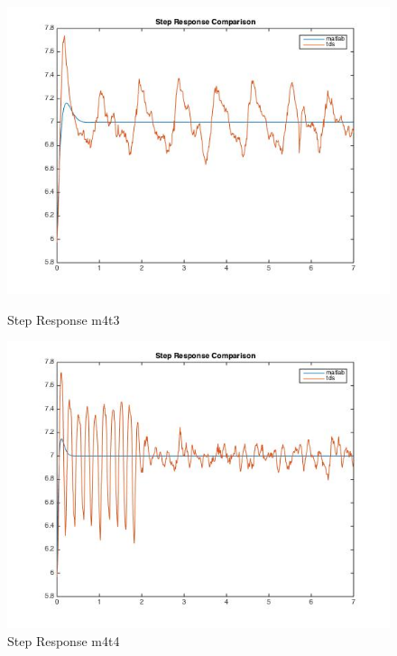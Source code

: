 \documentclass[11pt,titlepage]{article}
\begin{document}
    \begin{figure}[H]
        \centering
        \begin{minipage}{.5\textwidth}
            \centering
            \includegraphics[scale=.3]{stepM4_T3}
            \caption{Step Response m4t3}
            \label{fig:stepM4_T3}
        \end{minipage}%
        \begin{minipage}{.5\textwidth}
            \centering
            \includegraphics[scale=.3]{stepM4_T4}
            \caption{Step Response m4t4}
            \label{fig:stepM4_T4}
        \end{minipage}%
    \end{figure}
\end{document}

